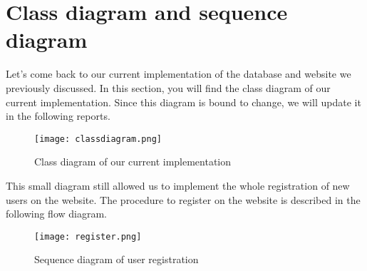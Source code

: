 \section{Class diagram and sequence diagram}

Let's come back to our current implementation of the database and website we previously discussed. In this section, you will find the class diagram of our current implementation. Since this diagram is bound to change, we will update it in the following reports.

\begin{figure}[!ht]
	\centering
	\texttt{[image: classdiagram.png]}
	\caption{Class diagram of our current implementation}
	\label{fig:length_eight_mouse}
\end{figure}
\FloatBarrier

This small diagram still allowed us to implement the whole registration of new users on the website. The procedure to register on the website is described in the following flow diagram.

\begin{figure}[!ht]
	\centering
	\texttt{[image: register.png]}
	\caption{Sequence diagram of user registration}
	\label{fig:length_eight_mouse}
\end{figure}
\FloatBarrier
